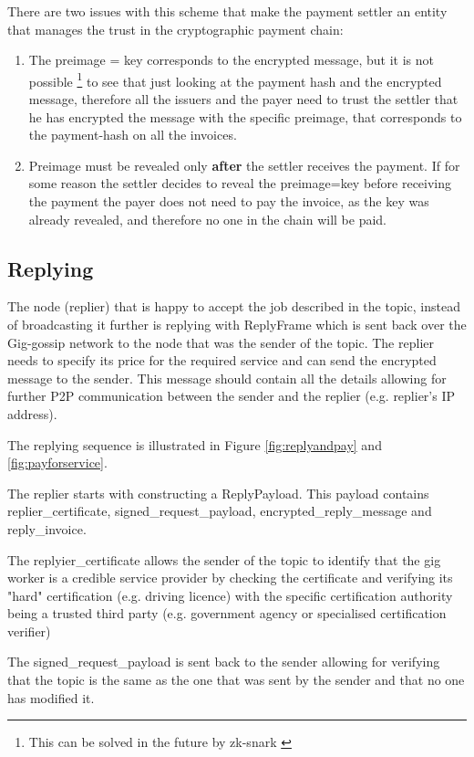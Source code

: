 \documentclass{article}
\begin{document}
There are two issues with this scheme that make the payment settler an entity that manages the trust in the cryptographic payment chain:
\begin{enumerate}
	\item The preimage = key corresponds to the encrypted message, but it is not possible \footnote{This can be solved in the future by zk-snark \cite{zksnark} } to see that just looking at the payment hash and the encrypted message, therefore all the issuers and the payer need to trust the settler that he has encrypted the message with the specific preimage, that corresponds to the payment-hash on all the invoices.
	\item Preimage must be revealed only \textbf{after} the settler receives the payment. If for some reason the settler decides to reveal the preimage=key before receiving the payment the payer does not need to pay the invoice, as the key was already revealed, and therefore no one in the chain will be paid.
\end{enumerate}


\subsection{Replying}
The node (replier) that is happy to accept the job described in the topic, instead of broadcasting it further is replying with ReplyFrame which is sent back over the Gig-gossip network to the node that was the sender of the topic. The replier needs to specify its price for the required service and can send the encrypted message to the sender. This message should contain all the details allowing for further P2P communication between the sender and the replier (e.g. replier's IP address).

The replying sequence is illustrated in Figure \ref{fig:replyandpay} and \ref{fig:payforservice}. 

The replier starts with constructing a ReplyPayload. This payload contains replier\_certificate, signed\_request\_payload, encrypted\_reply\_message and reply\_invoice.

The replyier\_certificate allows the sender of the topic to identify that the gig worker is a credible service provider by checking the certificate and verifying its "hard" certification (e.g. driving licence) with the specific certification authority being a trusted third party (e.g. government agency or specialised certification verifier)

The signed\_request\_payload is sent back to the sender allowing for verifying that the topic is the same as the one that was sent by the sender and that no one has modified it. 
\end{document}
